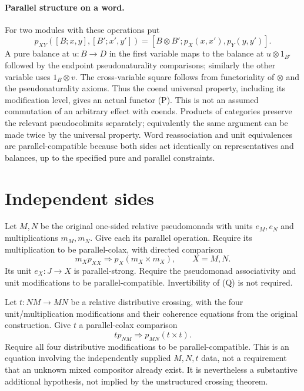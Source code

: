 \documentclass[11pt]{article}
\begin{document}
\paragraph{Parallel structure on a word.}
For two modules with these operations put
\[
 p_{XY}([B;x,y],[B';x',y'])
 =[B\otimes B';p_X(x,x'),p_Y(y,y')].                 \tag{P}
\]
A pure balance at $u:B\to D$ in the first variable maps to the balance at $u\otimes1_{B'}$ followed by the endpoint pseudonaturality comparisons; similarly the other variable uses $1_B\otimes v$. The cross-variable square follows from functoriality of $\otimes$ and the pseudonaturality axioms. Thus the coend universal property, including its modification level, gives an actual functor (P). This is not an assumed commutation of an arbitrary effect with coends. Products of categories preserve the relevant pseudocolimits separately; equivalently the same argument can be made twice by the universal property. Word reassociation and unit equivalences are parallel-compatible because both sides act identically on representatives and balances, up to the specified pure and parallel constraints.

\section{Independent sides}
Let $M,N$ be the original one-sided relative pseudomonads with units $e_M,e_N$ and multiplications $m_M,m_N$. Give each its parallel operation. Require its multiplication to be parallel-colax, with directed comparison
\[
 m_X p_{XX}\Longrightarrow p_X(m_X\times m_X),\qquad X=M,N.       \tag{Q}
\]
Its unit $e_X:J\to X$ is parallel-strong. Require the pseudomonad associativity and unit modifications to be parallel-compatible. Invertibility of (Q) is not required.

Let $t:NM\to MN$ be a relative distributive crossing, with the four unit/multiplication modifications and their coherence equations from the original construction. Give $t$ a parallel-colax comparison
\[
 t p_{NM}\Longrightarrow p_{MN}(t\times t).                    \tag{T}
\]
Require all four distributive modifications to be parallel-compatible. This is an equation involving the independently supplied $M,N,t$ data, not a requirement that an unknown mixed compositor already exist. It is nevertheless a substantive additional hypothesis, not implied by the unstructured crossing theorem.
\end{document}
